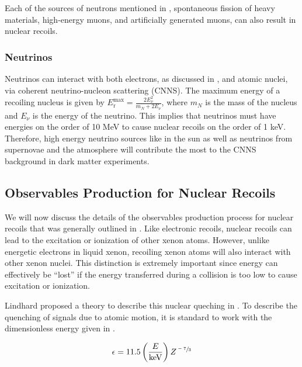 Each of the sources of neutrons mentioned in , spontaneous fission of heavy materials, high-energy muons, and artificially generated muons, can also result in nuclear recoils.




\subsubsection{Neutrinos}

Neutrinos can interact with both electrons, as discussed in , and atomic nuclei, via coherent neutrino-nucleon scattering (CNNS).  The maximum energy of a recoiling nucleus is given by $E_{\textrm{r}}^{\textrm{max}} = \frac{2 E_{\nu}^2}{m_N + 2 E_{\nu}}$, where $m_N$ is the mass of the nucleus and $E_{\nu}$ is the energy of the neutrino.  This implies that neutrinos must have energies on the order of 10 MeV to cause nuclear recoils on the order of 1 keV.  Therefore, high energy neutrino sources like  in the sun as well as neutrinos from supernovae and the atmosphere will contribute the most to the CNNS background in dark matter experiments.


\subsection{Observables Production for Nuclear Recoils}

We will now discuss the details of the observables production process for nuclear recoils that was generally outlined in .  Like electronic recoils, nuclear recoils can lead to the excitation or ionization of other xenon atoms.  However, unlike energetic electrons in liquid xenon, recoiling xenon atoms will also interact with other xenon nuclei.  This distinction is extremely important since energy can effectively be ``lost'' if the energy transferred during a collision is too low to cause excitation or ionization.  

Lindhard proposed a theory to describe this nuclear queching in .  To describe the quenching of signals due to atomic motion, it is standard to work with the dimensionless energy given in .

\begin{equation}
        \label{eqn:dimensionless_energy}
        \epsilon = 11.5 \left( \frac{E}{\textrm{keV}} \right) Z^{\sfrac{-7}{3}}
\end{equation}

